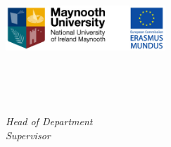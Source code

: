
\begin{titlepage}

\begin{addmargin}[-1cm]{-3cm}
\begin{center}
\large

\hfill
\vfill

\begingroup
\color{Maroon}\spacedallcaps{\myTitle} \\ \bigskip %
\endgroup

\spacedlowsmallcaps{\myName} %

\vfill

\includegraphics[width=6cm]{gfx/mu_em} \\ \bigskip %

\mySubtitle \\ \medskip %
\myDegree \\
\myDepartment \\
\myUni

\bigskip

\emph{Head of Department} \mySupervisor\\
\emph{Supervisor} \mySupervisor


\vfill


\end{center}
\end{addmargin}

\end{titlepage}
